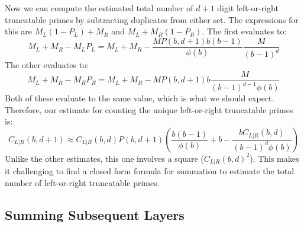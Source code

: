 \documentclass[12pt]{article}
\begin{document}
Now we can compute the estimated total number of $d+1$ digit left-or-right truncatable primes by subtracting duplicates from either set. The expressions for this are $M_L(1-P_L)+M_R$ and $M_L+M_R(1-P_R)$. The first evaluates to:
\begin{equation}
M_L + M_R - M_LP_L = M_L + M_R - \frac{MP(b,d+1)b(b-1)}{\phi(b)} \frac{M}{(b-1)^d}
\end{equation}
The other evaluates to:
\begin{equation}
M_L + M_R - M_RP_R = M_L + M_R - MP(b,d+1)b \frac{M}{(b-1)^{d-1}\phi(b)}
\end{equation}
Both of these evaluate to the same value, which is what we should expect. Therefore, our estimate for counting the unique left-or-right truncatable primes is:
\begin{equation}
C_{L|R}(b,d+1) \approx C_{L|R}(b,d)P(b,d+1) \left( \frac{b(b-1)}{\phi(b)} + b - \frac{bC_{L|R}(b,d)}{(b-1)^d\phi(b)} \right)
\end{equation}
Unlike the other estimates, this one involves a square ($C_{L|R}(b,d)^2$). This makes it challenging to find a closed form formula for summation to estimate the total number of left-or-right truncatable primes.

\subsection{Summing Subsequent Layers}
\end{document}
